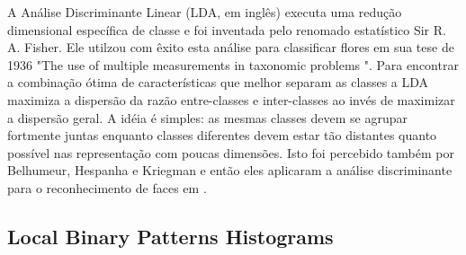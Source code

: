 A Análise Discriminante Linear (LDA, em inglês) executa uma redução dimensional específica de classe e foi inventada pelo renomado estatístico Sir R. A. Fisher. Ele utilzou com êxito esta análise para classificar flores em sua tese de 1936 "The use of multiple measurements in taxonomic problems \cite{fisher1936use}". Para encontrar a combinação ótima de características que melhor separam as  classes a LDA maximiza a dispersão da razão entre-classes e inter-classes ao invés de maximizar a dispersão geral. A idéia é simples: as mesmas classes devem se agrupar fortmente juntas enquanto classes diferentes devem estar tão distantes quanto possível nas representação com poucas dimensões. Isto foi percebido também por Belhumeur, Hespanha e Kriegman e então eles aplicaram a análise discriminante para o reconhecimento de faces em \cite{fisherfaces}.

\subsection*{Local Binary Patterns Histograms} %
\label{sub:local_binary_patterns_histograms}

